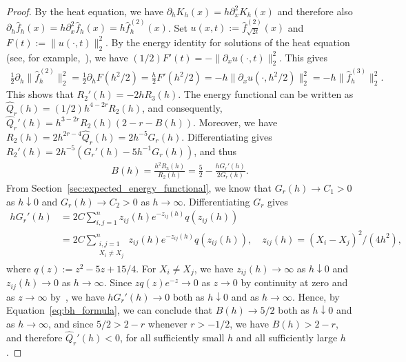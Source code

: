 \begin{proof}
    By the heat equation, we have $\partial_hK_h(x)=h\partial_x^2K_h(x)$ and therefore also $\partial_h\hat{f}_h(x)=h\partial_x^2\hat{f}_h(x)=h\hat{f}_h^{(2)}(x)$. Set $u(x,t):=\hat{f}^{(2)}_{\sqrt{2t}}(x)$ and $F(t):=\|u(\cdot,t)\|_2^2$. By the energy identity for solutions of the heat equation (see, for example,~\cite[Equation~(1.23)]{wang_decay_2012}), we have $(1/2)F'(t)=-\|\partial_xu(\cdot,t)\|_2^2$. This gives
    \begin{align*}
        \frac{1}{2}\partial_h\|\hat{f}_h^{(2)}\|_2^2=\frac{1}{2}\partial_h F(h^2/2)=\frac{h}{2}F'(h^2/2)=-h\|\partial_xu(\cdot,h^2/2)\|_2^2=-h\|\hat{f}^{(3)}_h\|_2^2.
    \end{align*}
    This shows that $R_2'(h)=-2hR_3(h)$. The energy functional can be written as $\hat{Q}_r(h)=(1/2)h^{4-2r}R_2(h)$, and consequently, $\hat{Q}_r'(h)=h^{3-2r}R_2(h)(2-r-B(h))$. Moreover, we have $R_2(h)=2h^{2r-4}\hat{Q}_r(h)=2h^{-5}G_r(h)$. Differentiating gives $R_2'(h)=2h^{-5}(G_r'(h)-5h^{-1}G_r(h))$, and thus
    \begin{align}\label{eq:bh_formula}
        B(h)=\frac{h^2R_3(h)}{R_2(h)}=\frac{5}{2}-\frac{hG_r'(h)}{2G_r(h)}.
    \end{align}
    From Section~\ref{sec:expected_energy_functional}, we know that $G_r(h)\to C_1>0$ as $h\downarrow0$ and $G_r(h)\to C_2>0$ as $h\to\infty$. Differentiating $G_r$ gives
    \begin{align*}
        hG_r'(h)&=2C\sum_{i,j=1}^{n}z_{ij}(h)e^{-z_{ij}(h)}q(z_{ij}(h))\\&
        =2C\sum_{\substack{i,j=1\\X_i\ne X_j}}^{n}z_{ij}(h)e^{-z_{ij}(h)}q(z_{ij}(h)),\quad z_{ij}(h)=(X_i-X_j)^2/(4h^2),
    \end{align*}
    where $q(z):=z^2-5z+15/4$. For $X_i\ne X_j$, we have $z_{ij}(h)\to\infty$ as $h\downarrow0$ and $z_{ij}(h)\to0$ as $h\to\infty$. Since $zq(z)e^{-z}\to0$ as $z\to0$ by continuity at zero and as $z\to\infty$ by~\cite[Theorem~8.6(f)]{rudin_real_1987}, we have $hG_r'(h)\to0$ both as $h\downarrow0$ and as $h\to\infty$. Hence, by Equation~\eqref{eq:bh_formula}, we can conclude that $B(h)\to5/2$ both as $h\downarrow0$ and as $h\to\infty$, and since $5/2>2-r$ whenever $r>-1/2$, we have $B(h)>2-r$, and therefore $\hat{Q}_r'(h)<0$, for all sufficiently small $h$ and all sufficiently large $h$.


\end{proof}

